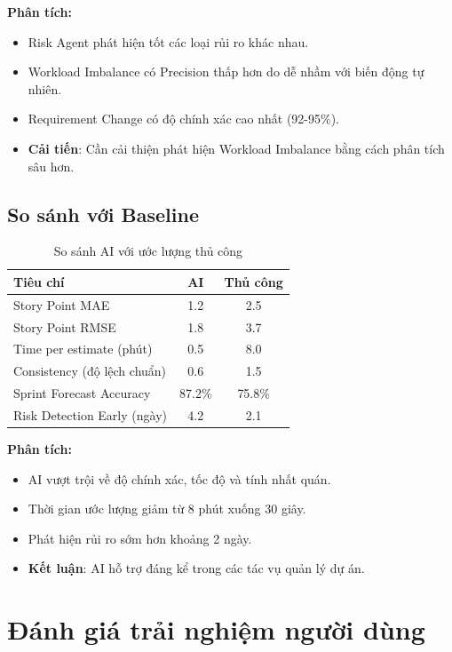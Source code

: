 \documentclass[12pt,a4paper]{report}
\begin{document}
\textbf{Phân tích:}
\begin{itemize}
\item Risk Agent phát hiện tốt các loại rủi ro khác nhau.
\item Workload Imbalance có Precision thấp hơn do dễ nhầm với biến động tự nhiên.
\item Requirement Change có độ chính xác cao nhất (92-95\%).
\item \textbf{Cải tiến}: Cần cải thiện phát hiện Workload Imbalance bằng cách phân tích sâu hơn.
\end{itemize}

\subsection{So sánh với Baseline}

\begin{table}[H]
\centering
\caption{So sánh AI với ước lượng thủ công}
\begin{tabular}{|p{5cm}|c|c|}
\hline
\textbf{Tiêu chí} & \textbf{AI} & \textbf{Thủ công} \\
\hline
Story Point MAE & 1.2 & 2.5 \\
\hline
Story Point RMSE & 1.8 & 3.7 \\
\hline
Time per estimate (phút) & 0.5 & 8.0 \\
\hline
Consistency (độ lệch chuẩn) & 0.6 & 1.5 \\
\hline
Sprint Forecast Accuracy & 87.2\% & 75.8\% \\
\hline
Risk Detection Early (ngày) & 4.2 & 2.1 \\
\hline
\end{tabular}
\label{tab:ai_vs_manual}
\end{table}

\textbf{Phân tích:}
\begin{itemize}
\item AI vượt trội về độ chính xác, tốc độ và tính nhất quán.
\item Thời gian ước lượng giảm từ 8 phút xuống 30 giây.
\item Phát hiện rủi ro sớm hơn khoảng 2 ngày.
\item \textbf{Kết luận}: AI hỗ trợ đáng kể trong các tác vụ quản lý dự án.
\end{itemize}

\section{Đánh giá trải nghiệm người dùng}
\end{document}
